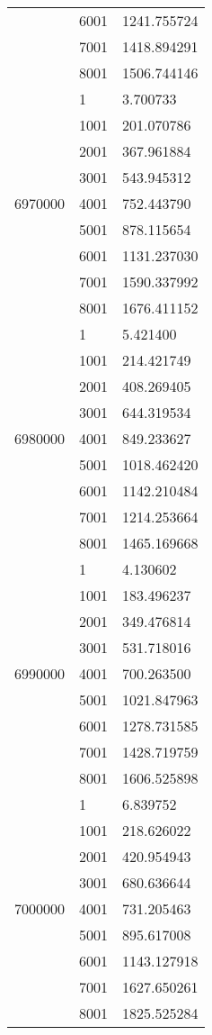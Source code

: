 \begin{table}[htb!]
\begin{tabular}{lll}
 & 6001 & 1241.755724 \\
 & 7001 & 1418.894291 \\
 & 8001 & 1506.744146 \\
\multirow[c]{9}{*}{6970000} & 1 & 3.700733 \\
 & 1001 & 201.070786 \\
 & 2001 & 367.961884 \\
 & 3001 & 543.945312 \\
 & 4001 & 752.443790 \\
 & 5001 & 878.115654 \\
 & 6001 & 1131.237030 \\
 & 7001 & 1590.337992 \\
 & 8001 & 1676.411152 \\
\multirow[c]{9}{*}{6980000} & 1 & 5.421400 \\
 & 1001 & 214.421749 \\
 & 2001 & 408.269405 \\
 & 3001 & 644.319534 \\
 & 4001 & 849.233627 \\
 & 5001 & 1018.462420 \\
 & 6001 & 1142.210484 \\
 & 7001 & 1214.253664 \\
 & 8001 & 1465.169668 \\
\multirow[c]{9}{*}{6990000} & 1 & 4.130602 \\
 & 1001 & 183.496237 \\
 & 2001 & 349.476814 \\
 & 3001 & 531.718016 \\
 & 4001 & 700.263500 \\
 & 5001 & 1021.847963 \\
 & 6001 & 1278.731585 \\
 & 7001 & 1428.719759 \\
 & 8001 & 1606.525898 \\
\multirow[c]{9}{*}{7000000} & 1 & 6.839752 \\
 & 1001 & 218.626022 \\
 & 2001 & 420.954943 \\
 & 3001 & 680.636644 \\
 & 4001 & 731.205463 \\
 & 5001 & 895.617008 \\
 & 6001 & 1143.127918 \\
 & 7001 & 1627.650261 \\
 & 8001 & 1825.525284 \\

\end{tabular}
\end{table}
